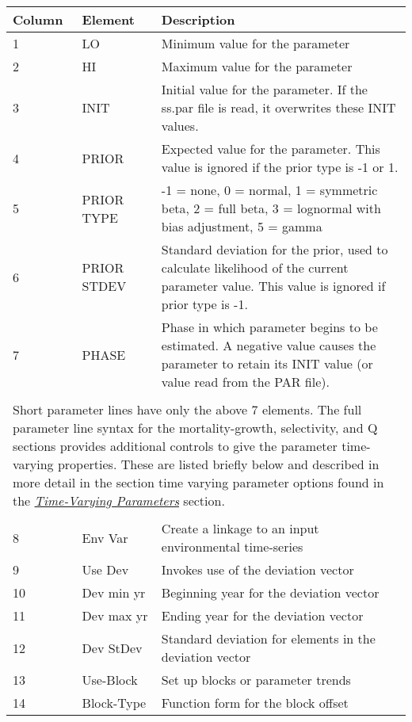 \begin{center}
	\begin{tabular}{p{2cm} p{3cm} p{10cm}}
		Column & Element & Description\\
		\hline
		1 & LO & Minimum value for the parameter\\
		2 & HI & Maximum value for the parameter\\
		3 & INIT & Initial value for the parameter.  If the ss.par file is read, it overwrites these INIT values.\\
		4 & PRIOR & Expected value for the parameter.  This value is ignored if the prior type is -1 or 1.\\
		5 & PRIOR TYPE  & -1 = none, 0 = normal, 1 = symmetric beta, 2 = full beta, 3 = lognormal with bias adjustment, 5 = gamma\\
		6 & PRIOR STDEV & Standard deviation for the prior, used to calculate likelihood of the current parameter value. This value is ignored if prior type is -1. \\
		7 & PHASE & Phase in which parameter begins to be estimated.  A negative value causes the parameter to retain its INIT value (or value read from the PAR file).\\
		 & & \\
		\multicolumn{3}{l}{\parbox{16cm}{Short parameter lines have only the above 7 elements.  The full parameter line syntax for the mortality-growth, selectivity, and Q sections provides additional controls to give the parameter time-varying properties.  These are listed briefly below and described in more detail in the section time varying parameter options found in the \hyperlink{TVpara}{\textit{Time-Varying Parameters}} section.}}\\
		 & & \\
		8 & Env Var & Create a linkage to an input environmental time-series\\
		9 & Use Dev & Invokes use of the deviation vector \\
		10 & Dev min yr & Beginning year for the deviation vector \\
		11 & Dev max yr & Ending year for the deviation vector\\
		12 & Dev StDev & Standard deviation for elements in the deviation vector \\
		13 & Use-Block & Set up blocks or parameter trends\\
		14 & Block-Type & Function form for the block offset\\
		\hline
	\end{tabular}
\end{center}

